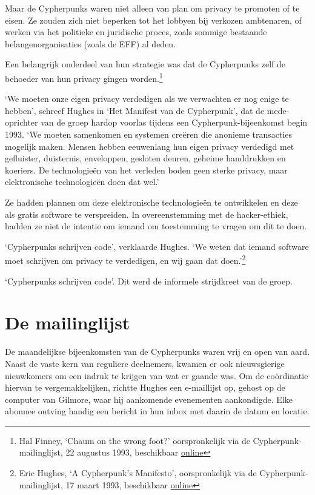 \documentclass[
  a5paper,
  smalldemyvopaper,11pt,twoside,onecolumn,openright,extrafontsizes]{memoir}
\begin{document}
Maar de Cypherpunks waren niet alleen van plan om privacy te promoten of
te eisen. Ze zouden zich niet beperken tot het lobbyen bij verkozen
ambtenaren, of werken via het politieke en juridische proces, zoals
sommige bestaande belangenorganisaties (zoals de EFF) al deden.

Een belangrijk onderdeel van hun strategie was dat de Cypherpunks zelf
de behoeder van hun privacy gingen worden.\footnote{Hal Finney, `Chaum
  on the wrong foot?' oorspronkelijk via de Cypherpunk-mailinglijst, 22
  augustus 1993, beschikbaar
  \href{https://cypherpunks.venona.com/date/1993/08/msg00652.html}{online}}

`We moeten onze eigen privacy verdedigen als we verwachten er nog enige
te hebben', schreef Hughes in `Het Manifest van de Cypherpunk', dat de
mede-oprichter van de groep hardop voorlas tijdens een
Cypherpunk-bijeenkomst begin 1993. `We moeten samenkomen en systemen
creëren die anonieme transacties mogelijk maken. Mensen hebben
eeuwenlang hun eigen privacy verdedigd met gefluister, duisternis,
enveloppen, gesloten deuren, geheime handdrukken en koeriers. De
technologieën van het verleden boden geen sterke privacy, maar
elektronische technologieën doen dat wel.'

Ze hadden plannen om deze elektronische technologieën te ontwikkelen en
deze als gratis software te verspreiden. In overeenstemming met de
hacker-ethiek, hadden ze niet de intentie om iemand om toestemming te
vragen om dit te doen.

`Cypherpunks schrijven code', verklaarde Hughes. `We weten dat iemand
software moet schrijven om privacy te verdedigen, en wij gaan dat
doen.'\footnote{Eric Hughes, `A Cypherpunk's Manifesto', oorspronkelijk
  via de Cypherpunk-mailinglijst, 17 maart 1993, beschikbaar
  \href{https://cypherpunks.venona.com/date/1993/03/msg00392.html}{online}}

`Cypherpunks schrijven code'. Dit werd de informele strijdkreet van de
groep.

\section{De mailinglijst}\label{de-mailinglijst}

De maandelijkse bijeenkomsten van de Cypherpunks waren vrij en open van
aard. Naast de vaste kern van reguliere deelnemers, kwamen er ook
nieuwsgierige nieuwkomers om een indruk te krijgen van wat er gaande
was. Om de coördinatie hiervan te vergemakkelijken, richtte Hughes een
e-maillijst op, gehost op de computer van Gilmore, waar hij aankomende
evenementen aankondigde. Elke abonnee ontving handig een bericht in hun
inbox met daarin de datum en locatie.
\end{document}
